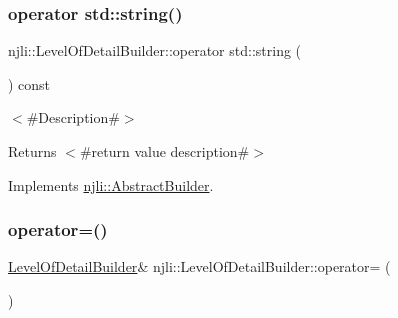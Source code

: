 \subsubsection{\texorpdfstring{operator std\+::string()}{operator std::string()}}
{\footnotesize\ttfamily njli\+::\+Level\+Of\+Detail\+Builder\+::operator std\+::string (\begin{DoxyParamCaption}{ }\end{DoxyParamCaption}) const\hspace{0.3cm}{\ttfamily [virtual]}}

$<$\#\+Description\#$>$

\begin{DoxyReturn}{Returns}
$<$\#return value description\#$>$ 
\end{DoxyReturn}


Implements \mbox{\hyperlink{classnjli_1_1_abstract_builder_a3e6e553e06d1ca30517ad5fb0bd4d000}{njli\+::\+Abstract\+Builder}}.

\mbox{\label{classnjli_1_1_level_of_detail_builder_ae7c4d3968b07a0471168762490a10012}} 
\subsubsection{\texorpdfstring{operator=()}{operator=()}}
{\footnotesize\ttfamily \mbox{\hyperlink{classnjli_1_1_level_of_detail_builder}{Level\+Of\+Detail\+Builder}}\& njli\+::\+Level\+Of\+Detail\+Builder\+::operator= (\begin{DoxyParamCaption}\item[{const \mbox{\hyperlink{classnjli_1_1_level_of_detail_builder}{Level\+Of\+Detail\+Builder}} \&}]{ }\end{DoxyParamCaption})\hspace{0.3cm}{\ttfamily [protected]}}

\mbox{\label{classnjli_1_1_level_of_detail_builder_a8784ca3914fe34bcdfa67c4ed31f663f}} 

